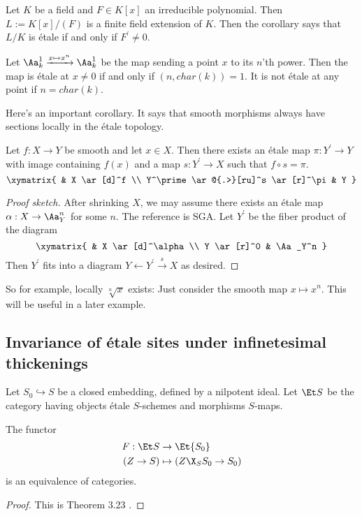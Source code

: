 \documentclass[11pt, english]{article}
\begin{document}
\begin{example}
Let $K$ be a field and $F \in K[x]$ an irreducible polynomial. Then $L := K[x]/(F)$ is a finite field extension of $K$. Then the corollary says that $L/K$ is étale if and only if $F^\prime \neq 0$. 
\end{example}

\begin{example}
  Let $\Aa_k^1 \xrightarrow{x \mapsto x^n} \Aa_k^1$ be the map sending a point $x$ to its $n$'th power. Then the map is étale at $x \neq 0$ if and only if $(n, char( k)) = 1$. It is not étale at any point if $n = char (k)$.
\end{example}

Here's an important corollary. It says that smooth morphisms always have sections locally in the étale topology.
\begin{corr}
\label{corr:homotopy}
Let $f:X \to Y$ be smooth and let $x \in X$. Then there exists an étale map $\pi:Y^\prime \to Y$ with image containing $f(x)$ and a map $s:Y^\prime \to X$ such that $f \circ s = \pi$. 
\[
\xymatrix{
 & X \ar[d]^f \\
Y^\prime \ar@{.>}[ru]^s  \ar[r]^\pi &  Y
}
\]
\end{corr}
\begin{proof}[Proof sketch]

After shrinking $X$, we may assume there exists an étale map $\alpha:X \to \Aa_Y^n$ for some $n$. The reference is SGA. Let $Y^\prime$ be the fiber product of the diagram
\[
\xymatrix{
 & X \ar[d]^\alpha \\
Y \ar[r]^0 & \Aa_Y^n
}
\]
Then $Y^\prime$ fits into a diagram $Y \leftarrow Y^\prime \xrightarrow{s} X$ as desired. 
\end{proof}

\begin{remark}
So for example, locally $\sqrt[n]{x}$ exists: Just consider the smooth map $x \mapsto x^n$. This will be useful in a later example.
\end{remark}

\subsection{Invariance of étale sites under infinetesimal thickenings}

Let $S_0 \hookrightarrow S$ be a closed embedding, defined by a nilpotent ideal. Let $\Et S$ be the category having objects étale $S$-schemes and morphisms $S$-maps.

\begin{thm}
The functor
\begin{align*}
F: \Et S &\to \Et {S_0} \\
(Z \to S) &\mapsto (Z \X_S S_0 \to S_0)
\end{align*}
is an equivalence of categories.
\end{thm}
\begin{proof} 
This is Theorem 3.23 \cite{milne_etale}.
\end{proof}
\end{document}
